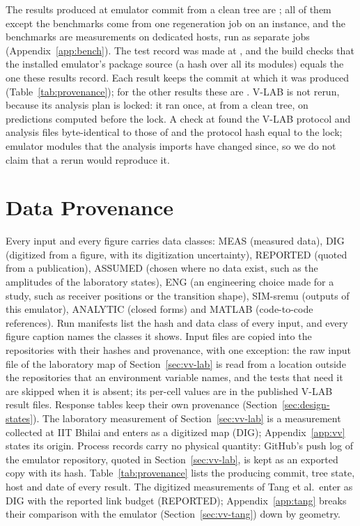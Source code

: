 The results produced at emulator commit \txtProvRegenCommit{} from a clean
tree are \txtProvRegenResults; all of them except the benchmarks come from one regeneration job
on an \txtProvRegenHost{} instance, and the benchmarks are measurements on dedicated hosts, run
as separate jobs (Appendix~\ref{app:bench}). The test record was made at
\txtProvTestCommit{}, and the build checks that the installed emulator's package source (a hash
over all its modules) equals the one these results record. Each result keeps the commit at which
it was produced (Table~\ref{tab:provenance}); for the other results these are
\txtProvOtherCommits. V-LAB is not rerun, because its analysis plan is locked: it ran once, at
\txtLabCodeCommit{} from a clean tree, on predictions computed before the lock. A check at
\txtProvTestCommit{} found the V-LAB protocol and analysis files byte-identical to those of
\txtLabCodeCommit{} and the protocol hash equal to the lock; emulator modules that the analysis
imports have changed since, so we do not claim that a rerun would reproduce it.

\section{Data Provenance}\label{app:provenance}
Every input and every figure carries data classes: MEAS (measured
data), DIG (digitized from a figure, with its digitization uncertainty), REPORTED
(quoted from a publication), ASSUMED (chosen where no data exist, such as the amplitudes of
the laboratory states), ENG (an engineering choice made for a study, such as receiver
positions or the transition shape), SIM-sremu (outputs of this emulator), ANALYTIC (closed
forms) and MATLAB (code-to-code references). Run manifests list the hash and data class of
every input, and every figure caption names the classes it shows. Input files are copied into
the repositories with their hashes and provenance, with one exception: the raw input file of
the laboratory map of Section~\ref{sec:vv-lab} is read from a location outside the repositories that
an environment variable names, and the tests that need it are skipped when it is absent; its
per-cell values are in the published V-LAB result files.
Response tables keep their own provenance (Section~\ref{sec:design-states}). The laboratory
measurement of Section~\ref{sec:vv-lab} is a measurement collected at IIT Bhilai and enters
as a digitized map (DIG); Appendix~\ref{app:vv} states its origin. Process records carry no
physical quantity: GitHub's push log of
the emulator repository, quoted in Section~\ref{sec:vv-lab}, is kept as an exported copy with
its hash. Table~\ref{tab:provenance} lists the producing commit, tree state, host and date of
every result. The digitized measurements of Tang et al.\ enter as DIG with the
reported link budget (REPORTED); Appendix~\ref{app:tang} breaks their comparison with the
emulator (Section~\ref{sec:vv-tang}) down by geometry.
